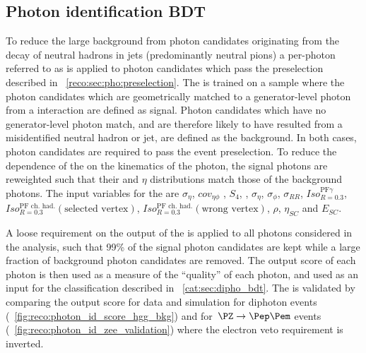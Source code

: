 \subsection{Photon identification BDT}
To reduce the large background from photon candidates originating from the decay of neutral hadrons in jets (predominantly neutral pions) a per-photon \BDT referred to as \PhoIdBdt is applied to photon candidates which pass the preselection described in \Sec~\ref{reco:sec:pho:preselection}. The \PhoIdBdt is trained on a \gammaJet sample where the photon candidates which are geometrically matched to a generator-level photon from a \pp interaction are defined as signal. Photon candidates which have no generator-level photon match, and are therefore likely to have resulted from a misidentified neutral hadron or jet, are defined as the background. In both cases, photon candidates are required to pass the event preselection. To reduce the dependence of the \PhoIdBdt on the kinematics of the photon, the signal photons are reweighted such that their \pT and $\eta$ distributions match those of the background photons. The input variables for the \PhoIdBdt are $\sigma_{\eta}$, $cov_{\eta \phi}$ , $S_{4} $, \RNINE , $\sigma_{\eta} $, $\sigma_{\phi }$, $\sigma_{RR}$, $Iso^{\textrm{PF}\gamma}_{R=0.3}$, $Iso^{\textrm{PF ch. had.}}_{R=0.3}(\textrm{selected vertex})$, $Iso^{\textrm{PF ch. had.}}_{R=0.3}(\textrm{wrong vertex})$, $\rho$, $\eta_{SC}$ and $E_{SC}$. 

A loose requirement on the output of the \PhoIdBdt is applied to all photons considered in the analysis, such that 99\% of the signal photon candidates are kept while a large fraction of background photon candidates are removed. The \PhoIdBdt output score of each photon is then used as a measure of the ``quality'' of each photon, and used as an input for the classification \BDT described in \Sec~\ref{cat:sec:dipho_bdt}.
The \PhoIdBdt is validated by comparing the output score for data and simulation for diphoton events (\Fig~\ref{fig:reco:photon_id_score_hgg_bkg}) and for $\Zee$ events (\Fig~\ref{fig:reco:photon_id_zee_validation}) where the electron veto requirement is inverted.


